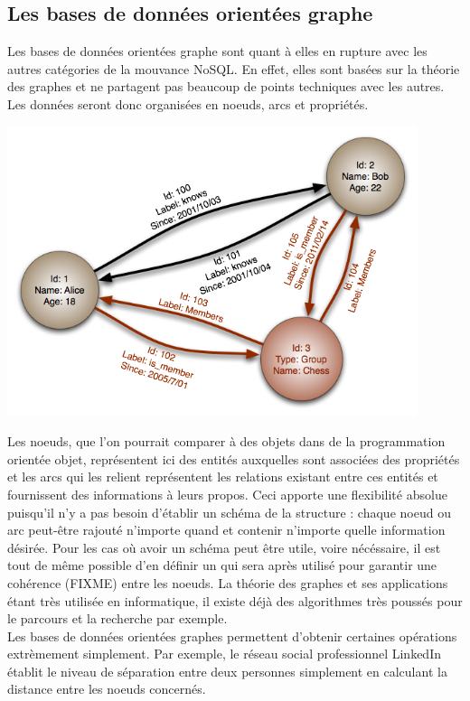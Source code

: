 \documentclass[11pt]{article}
\begin{document}
\subsection{Les bases de données orientées graphe}
Les bases de données orientées graphe sont quant à elles en rupture avec les autres catégories de la mouvance NoSQL. En effet, elles sont basées sur la théorie des graphes et ne partagent pas beaucoup de points techniques avec les autres. Les données seront donc organisées en noeuds, arcs et propriétés. \\
\begin{center}
  \includegraphics[width=12cm]{nosql_graph.png}
\end{center}
Les noeuds, que l'on pourrait comparer à des objets dans de la programmation orientée objet, représentent ici des entités auxquelles sont associées des propriétés et les arcs qui les relient représentent les relations existant entre ces entités et fournissent des informations à leurs propos. Ceci apporte une flexibilité absolue puisqu'il n'y a pas besoin d'établir un schéma de la structure : chaque noeud ou arc peut-être rajouté n'importe quand et contenir n'importe quelle information désirée. Pour les cas où avoir un schéma peut être utile, voire nécéssaire, il est tout de même possible d'en définir un qui sera après utilisé pour garantir une cohérence (FIXME) entre les noeuds. La théorie des graphes et ses applications étant très utilisée en informatique, il existe déjà des algorithmes très poussés pour le parcours et la recherche par exemple. \\
Les bases de données orientées graphes permettent d'obtenir certaines opérations extrèmement simplement. Par exemple, le réseau social professionnel LinkedIn établit le niveau de séparation entre deux personnes simplement en calculant la distance entre les noeuds concernés.
\end{document}
